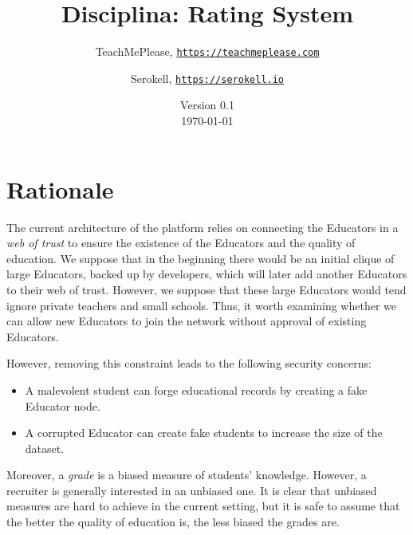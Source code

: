 \documentclass[a4paper]{article}
\title{Disciplina: Rating System}
\author{
TeachMePlease, \href{https://teachmeplease.com}{\texttt{https://teachmeplease.com}} \and
Serokell, \href{https://serokell.io}{\texttt{https://serokell.io}}
}
\date{%
  Version 0.1\\%
  \today
}
\begin{document}
\maketitle

\section*{Rationale}
The current architecture of the platform relies on connecting the Educators in a
\textit{web of trust} to ensure the existence of the Educators and the quality
of education. We suppose that in the beginning there would be an initial clique
of large Educators, backed up by developers, which will later add another
Educators to their web of trust. However, we suppose that these large Educators would
tend ignore private teachers and small schools. Thus, it worth examining whether
we can allow new Educators to join the network without approval of existing Educators.

However, removing this constraint leads to the following security concerns:
\begin{itemize}
\item A malevolent student can forge educational records by creating a fake Educator node.
\item A corrupted Educator can create fake students to increase the size of the dataset.
\end{itemize}

Moreover, a \textit{grade} is a biased measure of students' knowledge. However, a recruiter is generally interested in an unbiased one. It is clear that unbiased measures are hard to achieve in the current setting, but it is safe to assume that the better the quality of education is, the less biased the grades are.
\end{document}
